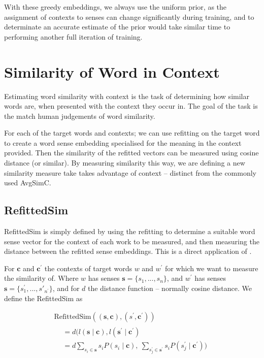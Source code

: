 \documentclass{sig-alternate}
\renewcommand{\c}{\mathbf{c}}
\newcommand{\s}{\mathbf{s}}
\begin{document}
With these greedy embeddings, we always use the uniform prior, as the assignment of contexts  to senses can change significantly during training, and to determinate an accurate estimate of the prior would take similar time to performing another full iteration of training.



\section{Similarity of Word in Context} \label{SimilarityInContext}
Estimating word similarity with context is the task of determining how similar words are, when presented with the context they occur in. The goal of the task is the match human judgements of word similarity.

For each of the target words and contexts; we can use refitting on the target word to create a word sense embedding specialised for the meaning in the context provided. Then the similarity of the refitted vectors can be measured using cosine distance (or similar).
By measuring similarity this way, we are defining a new similarity measure take takes advantage of context -- distinct from the commonly used AvgSimC.


\subsection{RefittedSim}\label{RefittedSimVsAvgSimC}
RefittedSim is simply defined by using the refitting to determine a suitable word sense vector for the context of each work to be measured, and then measuring the distance between the refitted sense embeddings.
This is a direct application of .

For $\c$ and $\c^\prime$ the contexts of target words $w$ and $w^\prime$ for which we want to measure the similarity of. Where $w$ has senses $\s=\{s_1,...,s_n\}$, and $w^\prime$ has senses $\s=\{s^\prime_1,...,s\prime_{n^\prime}\}$, and for $d$ the distance function -- normally cosine distance. We define the RefittedSim as

\begin{multline} \label{eq:refittedsim}
\mathrm{RefittedSim}((\s,\c),(s^{\prime},\c^{\prime}))\\
\begin{aligned}
&= d(l(\s \mid \c), l(\s^\prime \mid \c^\prime)\\
&= d
\sum_{s_{i}\in\s}s_{i}P(s_{i}\mid\c),\:
\sum_{s_{j}^{\prime}\in\s^{\prime}}s_{i}P(s_{j}^{\prime}\mid\c^{\prime}))
\end{aligned}
\end{multline}
\end{document}
